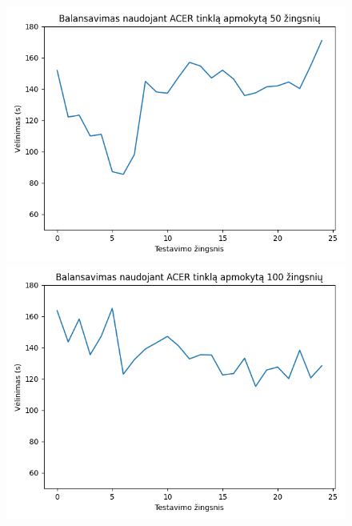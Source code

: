 \documentclass{VUMIFPSbakalaurinis}
\begin{document}
\begin{figure}[H]
    \centering
    \begin{minipage}[b]{0.45\textwidth}
        \includegraphics[width=\textwidth]{img/acer_50_2.png}
    \end{minipage}
    \hspace{1mm}
    \begin{minipage}[b]{0.45\textwidth}
        \includegraphics[width=\textwidth]{img/acer_100_2.png}
    \end{minipage}
    \hspace{1mm}
    \begin{minipage}[b]{0.45\textwidth}

\end{minipage}
\end{figure}
\end{document}
